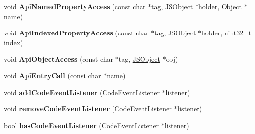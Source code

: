 \begin{DoxyCompactItemize}
\item 
\hypertarget{classv8_1_1internal_1_1_logger_aa2654b090974d25e35d51a14f90ddf06}{}void {\bfseries Api\+Named\+Property\+Access} (const char $\ast$tag, \hyperlink{classv8_1_1internal_1_1_j_s_object}{J\+S\+Object} $\ast$holder, \hyperlink{classv8_1_1internal_1_1_object}{Object} $\ast$name)\label{classv8_1_1internal_1_1_logger_aa2654b090974d25e35d51a14f90ddf06}

\item 
\hypertarget{classv8_1_1internal_1_1_logger_afe8a98fc8134ed8a3daaa581a304986c}{}void {\bfseries Api\+Indexed\+Property\+Access} (const char $\ast$tag, \hyperlink{classv8_1_1internal_1_1_j_s_object}{J\+S\+Object} $\ast$holder, uint32\+\_\+t index)\label{classv8_1_1internal_1_1_logger_afe8a98fc8134ed8a3daaa581a304986c}

\item 
\hypertarget{classv8_1_1internal_1_1_logger_ad52311ceb7d9b9056b033850ff42f56d}{}void {\bfseries Api\+Object\+Access} (const char $\ast$tag, \hyperlink{classv8_1_1internal_1_1_j_s_object}{J\+S\+Object} $\ast$obj)\label{classv8_1_1internal_1_1_logger_ad52311ceb7d9b9056b033850ff42f56d}

\item 
\hypertarget{classv8_1_1internal_1_1_logger_a1240868d15412e1543074364a1242dee}{}void {\bfseries Api\+Entry\+Call} (const char $\ast$name)\label{classv8_1_1internal_1_1_logger_a1240868d15412e1543074364a1242dee}

\item 
\hypertarget{classv8_1_1internal_1_1_logger_a531e78bf922b282c17839302d48e7cfd}{}void {\bfseries add\+Code\+Event\+Listener} (\hyperlink{classv8_1_1internal_1_1_code_event_listener}{Code\+Event\+Listener} $\ast$listener)\label{classv8_1_1internal_1_1_logger_a531e78bf922b282c17839302d48e7cfd}

\item 
\hypertarget{classv8_1_1internal_1_1_logger_a09f4eaee73f8d0cebf33e2cc1737fefb}{}void {\bfseries remove\+Code\+Event\+Listener} (\hyperlink{classv8_1_1internal_1_1_code_event_listener}{Code\+Event\+Listener} $\ast$listener)\label{classv8_1_1internal_1_1_logger_a09f4eaee73f8d0cebf33e2cc1737fefb}

\item 
\hypertarget{classv8_1_1internal_1_1_logger_a7482d3d2c94c5802c1907b74458d2241}{}bool {\bfseries has\+Code\+Event\+Listener} (\hyperlink{classv8_1_1internal_1_1_code_event_listener}{Code\+Event\+Listener} $\ast$listener)\label{classv8_1_1internal_1_1_logger_a7482d3d2c94c5802c1907b74458d2241}


\end{DoxyCompactItemize}
